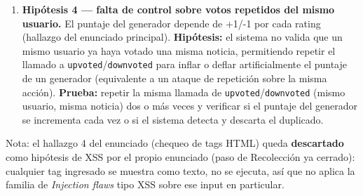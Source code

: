 \begin{enumerate}
  \item \textbf{Hipótesis 4 --- falta de control sobre votos repetidos del mismo usuario.} El
  puntaje del generador depende de +1/-1 por cada rating (hallazgo del enunciado principal).
  \textbf{Hipótesis:} el sistema no valida que un mismo usuario ya haya votado una misma
  noticia, permitiendo repetir el llamado a \texttt{upvoted}/\texttt{downvoted} para inflar o
  deflar artificialmente el puntaje de un generador (equivalente a un ataque de repetición
  sobre la misma acción). \textbf{Prueba:} repetir la misma llamada de
  \texttt{upvoted}/\texttt{downvoted} (mismo usuario, misma noticia) dos o más veces y verificar
  si el puntaje del generador se incrementa cada vez o si el sistema detecta y descarta el
  duplicado.
\end{enumerate}

Nota: el hallazgo 4 del enunciado (chequeo de tags HTML) queda \textbf{descartado} como
hipótesis de XSS por el propio enunciado (paso de Recolección ya cerrado): cualquier tag
ingresado se muestra como texto, no se ejecuta, así que no aplica la familia de
\emph{Injection flaws} tipo XSS sobre ese input en particular.
